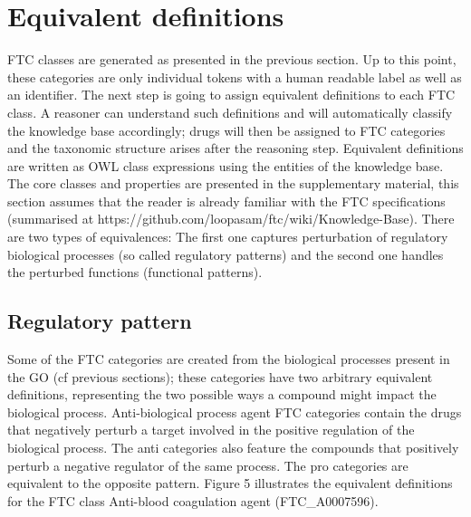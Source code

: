 \documentclass{bioinfo}
\begin{document}
\section{Equivalent definitions}
FTC classes are generated as presented in the previous section. Up to this point, these categories 
are only individual tokens with a human readable label as well as an identifier. The next step is going to 
assign equivalent definitions to each FTC class. A reasoner can understand such definitions and will automatically 
classify the knowledge base accordingly; drugs will then be assigned to FTC categories and the taxonomic structure 
arises after the reasoning step. Equivalent definitions are written as OWL class expressions using the entities of 
the knowledge base. The core classes and properties are presented in the supplementary material, this section assumes 
that the reader is already familiar with the FTC specifications (summarised at {{https://github.com/loopasam/ftc/wiki/Knowledge-Base}}). 
There are two types of equivalences: The first one captures perturbation of regulatory 
biological processes (so called regulatory patterns) and the second one handles the perturbed functions (functional patterns).

\subsection{Regulatory pattern}
Some of the FTC categories are created from the biological processes present in the 
GO (cf previous sections); these categories have two arbitrary equivalent definitions, representing the 
two possible ways a compound might impact the biological process. Anti-biological process agent FTC categories 
contain the drugs that negatively perturb a target involved in the positive regulation of the biological process. 
The anti categories also feature the compounds that positively perturb a negative regulator of the same process. 
The pro categories are equivalent to the opposite pattern. Figure 5 illustrates the equivalent definitions for the 
FTC class Anti-blood coagulation agent (FTC_A0007596).
 
\end{document}
